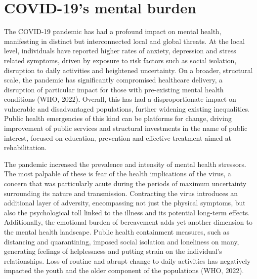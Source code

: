 


 \section{COVID-19's mental burden}
    The COVID-19 pandemic has had a profound impact on mental health, manifesting in distinct but interconnected local and global threats. At the local level, individuals have reported higher rates of anxiety, depression and stress related symptoms, driven by exposure to risk factors such as social isolation, disruption to daily activities and heightened uncertainty. On a broader, structural scale, the pandemic has significantly compromised healthcare delivery, a disruption of particular impact for those with pre-existing mental health conditions (WHO, 2022). Overall, this has had a disproportionate impact on vulnerable and disadvantaged populations, further widening existing inequalities. 
    Public health emergencies of this kind can be platforms for change, driving improvement of public services and structural investments in the name of public interest, focused on education, prevention and effective treatment aimed at rehabilitation. 

    The pandemic increased the prevalence and intensity of mental health stressors. The most palpable of these is fear of the health implications of the virus, a concern that was particularly acute during the periods of maximum uncertainty surrounding its nature and transmission. Contracting the virus introduces an additional layer of adversity, encompassing not just the physical symptoms, but also the psychological toll linked to the illness and its potential long-term effects. Additionally, the emotional burden of bereavement adds yet another dimension to the mental health landscape.
    Public health containment measures, such as distancing and quarantining, imposed social isolation and loneliness on many, generating feelings of helplessness and putting strain on the individual's relationships. Loss of routine and abrupt change to daily activities has negatively impacted the youth and the older component of the populations (WHO, 2022). 

